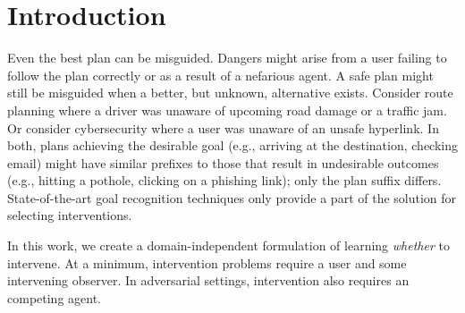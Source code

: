 \documentclass[letterpaper]{article}
\theoremstyle{plain}
\begin{document}
\section{Introduction}\label{sec:intro}
Even the best plan can be misguided.
Dangers might arise from a user failing to follow the plan correctly or as a result of a nefarious agent.
A safe plan might still be misguided when a better, but unknown, alternative exists.
Consider route planning where a driver was unaware of upcoming road damage or a traffic jam.  
Or consider cybersecurity where a user was unaware of an unsafe hyperlink.
In both, plans achieving the desirable goal (e.g., arriving at the destination, checking email) might have similar prefixes to those that result in undesirable outcomes (e.g., hitting a pothole, clicking on a phishing link); only the plan suffix differs.
State-of-the-art goal recognition techniques only provide a part of the solution for selecting interventions.

In this work, we create a domain-independent formulation of learning \emph{whether} to intervene.
At a minimum, intervention problems require a user and some intervening observer.
In adversarial settings, intervention also requires an competing agent.
\end{document}
